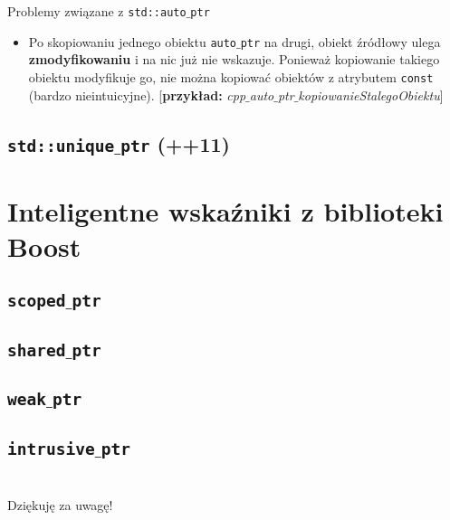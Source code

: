 \begin{frame}{Problemy związane z \texttt{std::auto$\_$ptr}}
  \begin{itemize}
  \item Po skopiowaniu jednego obiektu \texttt{auto$\_$ptr} na drugi,
    obiekt źródłowy ulega \textbf{zmodyfikowaniu} i na nic już nie wskazuje.
    \pause
    Ponieważ kopiowanie takiego obiektu modyfikuje go, 
    nie można kopiować obiektów z atrybutem \texttt{const}
    (bardzo nieintuicyjne).
    [\textbf{przykład:} 
    \textit{cpp$\_$auto$\_$ptr$\_$kopiowanieStalegoObiektu}]
  \end{itemize}
\end{frame}

\subsection{\texttt{std::unique$\_$ptr} \tiny{(\C++11)}}


\section{Inteligentne wskaźniki z biblioteki Boost}
\subsection{\texttt{scoped$\_$ptr}}

\subsection{\texttt{shared$\_$ptr}}

\subsection{\texttt{weak$\_$ptr}}

\subsection{\texttt{intrusive$\_$ptr}}

\section{}
\begin{frame}
  \begin{center}
    \huge
    Dziękuję za uwagę!
  \end{center}
 
  
\end{frame}


